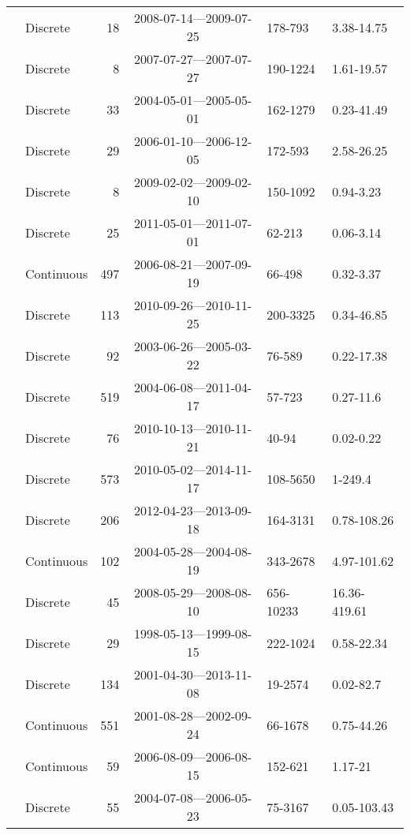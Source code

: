 \begin{longtable}{llrcll}
  \citet{Griffin2011} & Discrete &  18 & 2008-07-14---2009-07-25 & 178-793 & 3.38-14.75 \\ 
  \citet{Gueguen2011} & Discrete &   8 & 2007-07-27---2007-07-27 & 190-1224 & 1.61-19.57 \\ 
  \citet{Helms2008} & Discrete &  33 & 2004-05-01---2005-05-01 & 162-1279 & 0.23-41.49 \\ 
  \citet{Hernes2008} & Discrete &  29 & 2006-01-10---2006-12-05 & 172-593 & 2.58-26.25 \\ 
  \citet{Hong2012} & Discrete &   8 & 2009-02-02---2009-02-10 & 150-1092 & 0.94-3.23 \\ 
  \citet{Hur2014} & Discrete &  25 & 2011-05-01---2011-07-01 & 62-213 & 0.06-3.14 \\ 
  \citet{kattegat} & Continuous & 497 & 2006-08-21---2007-09-19 & 66-498 & 0.32-3.37 \\ 
  \citet{Kellerman2015} & Discrete & 113 & 2010-09-26---2010-11-25 & 200-3325 & 0.34-46.85 \\ 
  \citet{Kowalczuk2010} & Discrete &  92 & 2003-06-26---2005-03-22 & 76-589 & 0.22-17.38 \\ 
  \citet{Kowalczuk2010a} & Discrete & 519 & 2004-06-08---2011-04-17 & 57-723 & 0.27-11.6 \\ 
  \citet{Kowalczuk2013} & Discrete &  76 & 2010-10-13---2010-11-21 & 40-94 & 0.02-0.22 \\ 
  \citet{Lambert2015a} & Discrete & 573 & 2010-05-02---2014-11-17 & 108-5650 & 1-249.4 \\ 
  \citet{Loken2016} & Discrete & 206 & 2012-04-23---2013-09-18 & 164-3131 & 0.78-108.26 \\ 
  \citet{lter2004} & Continuous & 102 & 2004-05-28---2004-08-19 & 343-2678 & 4.97-101.62 \\ 
  \citet{lter2008} & Discrete &  45 & 2008-05-29---2008-08-10 & 656-10233 & 16.36-419.61 \\ 
  \citet{lter5653} & Discrete &  29 & 1998-05-13---1999-08-15 & 222-1024 & 0.58-22.34 \\ 
  \citet{lter5689} & Discrete & 134 & 2001-04-30---2013-11-08 & 19-2574 & 0.02-82.7 \\ 
  \citet{Markager2011} & Continuous & 551 & 2001-08-28---2002-09-24 & 66-1678 & 0.75-44.26 \\ 
  \citet{Massicotte2011EA} & Continuous &  59 & 2006-08-09---2006-08-15 & 152-621 & 1.17-21 \\ 
  \citet{Moran2006} & Discrete &  55 & 2004-07-08---2006-05-23 & 75-3167 & 0.05-103.43 \\ 

\end{longtable}
